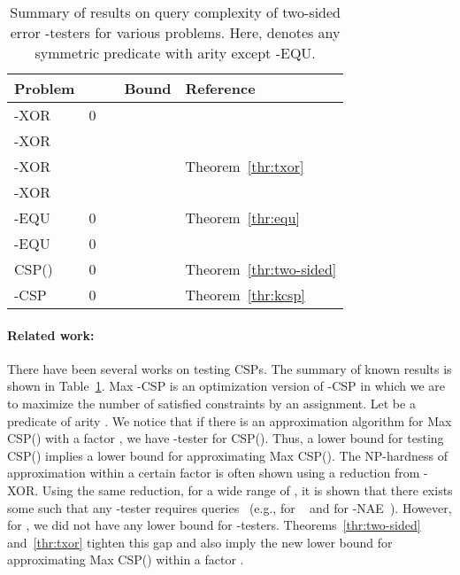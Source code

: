 \documentclass[letterpaper,11pt]{article}
\newcommand{\kcsp}{\textsf{-CSP}\xspace}
\newcommand{\csp}[1]{\textsf{CSP}(#1)\xspace}
\newcommand{\xor}{\textsf{XOR}\xspace}
\newcommand{\nae}{\textsf{NAE}\xspace}
\newcommand{\txor}{\textsf{-XOR}\xspace}
\newcommand{\kequ}{-\textsf{EQU}\xspace}
\newcommand{\maxcsp}[1]{\textsf{Max CSP}(#1)\xspace}
\newcommand{\maxkcsp}{\textsf{Max -CSP}\xspace}
\begin{document}
\begin{table}[t]
  \caption{Summary of results on query complexity of two-sided error -testers for various problems. Here,  denotes any symmetric predicate with arity  except \kequ.}
  \label{tbl:summary}
  \begin{center}
    \begin{tabular}{|l|l|l|l|l|}
      \hline
      Problem &  &  & Bound & Reference \\
      \hline
      \txor & 0 &  &  & \cite{GR99,GR08}\\ 
      \hline
      \txor &  &  &  & \cite{YI10}\\
      \hline
      \txor &  &  &  & Theorem~\ref{thr:txor} \\
      \hline
      -\xor &  &  &  & \cite{BOT02} \\
      \hline
      \kequ & 0 &  &  & Theorem~\ref{thr:equ}\\
      \hline
      \kequ& 0 &  &  & \cite{GR08} \\
      \hline
      \csp{} & 0 &  &  & Theorem~\ref{thr:two-sided} \\
      \hline
      \kcsp & 0 &  &  & Theorem~\ref{thr:kcsp} \\
      \hline
    \end{tabular}
  \end{center}
\end{table}

\paragraph{Related work:}
There have been several works on testing CSPs.
The summary of known results is shown in Table~\ref{tbl:summary}.
\maxkcsp is an optimization version of \kcsp in which we are to maximize the number of satisfied constraints by an assignment.
Let  be a predicate of arity .
We notice that if there is an approximation algorithm for \maxcsp{} with a factor ,
we have -tester for \csp{}.
Thus, a lower bound for testing \csp{} implies a lower bound for approximating \maxcsp{}.
The NP-hardness of approximation within a certain factor is often shown using a reduction from -\xor.
Using the same reduction, 
for a wide range of ,
it is shown that there exists some  such that any -tester requires  queries~\cite{YI10} (e.g.,  for ~\cite{Has01} and  for -\nae~\cite{Zwi98}).
However, for ,
we did not have any lower bound for -testers.
Theorems~\ref{thr:two-sided} and~\ref{thr:txor} tighten this gap and also imply the new lower bound  for approximating \maxcsp{} within a factor .
\end{document}
